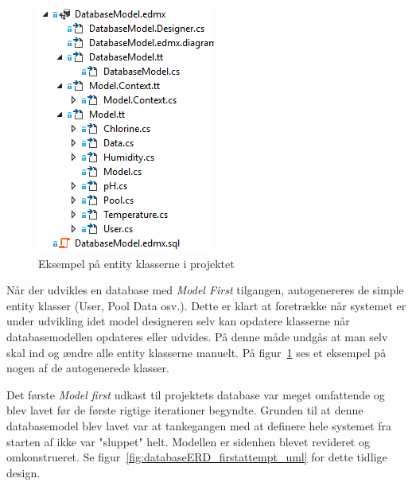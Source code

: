 \begin{figure}
\centering
\includegraphics[width=0.35\linewidth]{figs/generatedFiles}
\caption{Eksempel på entity klasserne i projektet}
\label{fig:generatedFiles}
\end{figure}

Når der udvikles en database med \textit{Model First} tilgangen, autogenereres de simple entity klasser (User, Pool Data osv.). Dette er klart at foretrække når systemet er under udvikling idet model designeren selv kan opdatere klasserne når databasemodellen opdateres eller udvides. På denne måde undgås at man selv skal ind og ændre alle entity klasserne manuelt. På figur~\ref{fig:generatedFiles} ses et eksempel på nogen af de autogenerede klasser.

Det første \textit{Model first} udkast til projektets database var meget omfattende og blev lavet før de første rigtige iterationer begyndte. Grunden til at denne databasemodel blev lavet var at tankegangen med at definere hele systemet fra starten af ikke var "sluppet" helt. Modellen er sidenhen blevet revideret og omkonstrueret. Se figur~\ref{fig:databaseERD_firstattempt_uml} for dette tidlige design.

